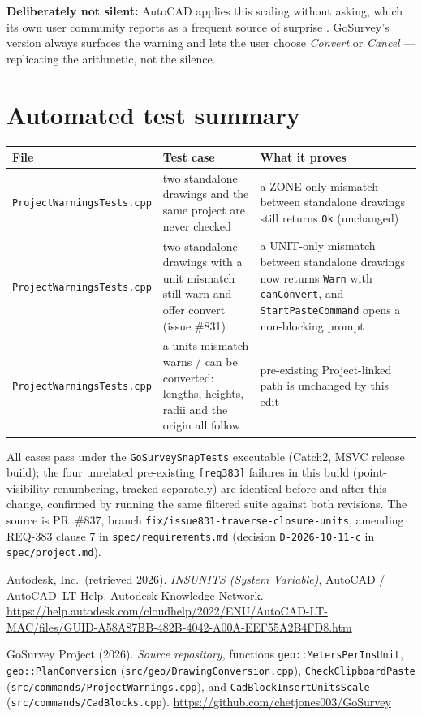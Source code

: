 \documentclass[11pt]{article}
\begin{document}
\textbf{Deliberately not silent:} AutoCAD applies this scaling without
asking, which its own user community reports as a frequent source of
surprise \citep{autodeskInsunits}. GoSurvey's version always surfaces the
warning and lets the user choose \emph{Convert} or \emph{Cancel} ---
replicating the arithmetic, not the silence.

\section{Automated test summary}

\begin{center}
\small
\begin{tabular}{@{}L{0.3\textwidth}L{0.34\textwidth}L{0.28\textwidth}@{}}
\toprule
File & Test case & What it proves \\
\midrule
\texttt{ProjectWarningsTests.cpp} &
  two standalone drawings and the same project are never checked &
  a ZONE-only mismatch between standalone drawings still returns \texttt{Ok} (unchanged) \\[0.3em]
\texttt{ProjectWarningsTests.cpp} &
  two standalone drawings with a unit mismatch still warn and offer convert (issue \#831) &
  a UNIT-only mismatch between standalone drawings now returns \texttt{Warn} with \texttt{canConvert}, and \texttt{StartPasteCommand} opens a non-blocking prompt \\[0.3em]
\texttt{ProjectWarningsTests.cpp} &
  a units mismatch warns / can be converted: lengths, heights, radii and the origin all follow &
  pre-existing Project-linked path is unchanged by this edit \\
\bottomrule
\end{tabular}
\end{center}

All cases pass under the \texttt{GoSurveySnapTests} executable (Catch2,
MSVC release build); the four unrelated pre-existing \texttt{[req383]}
failures in this build (point-visibility renumbering, tracked separately)
are identical before and after this change, confirmed by running the same
filtered suite against both revisions. The source is PR~\#837, branch
\texttt{fix/issue831-traverse-closure-units}, amending REQ-383 clause 7 in
\texttt{spec/requirements.md} (decision \texttt{D-2026-10-11-c} in
\texttt{spec/project.md}).

\begin{thebibliography}{9}

Autodesk, Inc.\ (retrieved 2026). \emph{INSUNITS (System Variable)},
AutoCAD / AutoCAD~LT Help. Autodesk Knowledge Network.
\url{https://help.autodesk.com/cloudhelp/2022/ENU/AutoCAD-LT-MAC/files/GUID-A58A87BB-482B-4042-A00A-EEF55A2B4FD8.htm}

GoSurvey Project (2026). \emph{Source repository}, functions
\texttt{geo::MetersPerInsUnit}, \texttt{geo::PlanConversion}
(\texttt{src/geo/DrawingConversion.cpp}), \texttt{CheckClipboardPaste}
(\texttt{src/commands/ProjectWarnings.cpp}), and
\texttt{CadBlockInsertUnitsScale} (\texttt{src/commands/CadBlocks.cpp}).
\url{https://github.com/chetjones003/GoSurvey}

\end{thebibliography}
\end{document}
